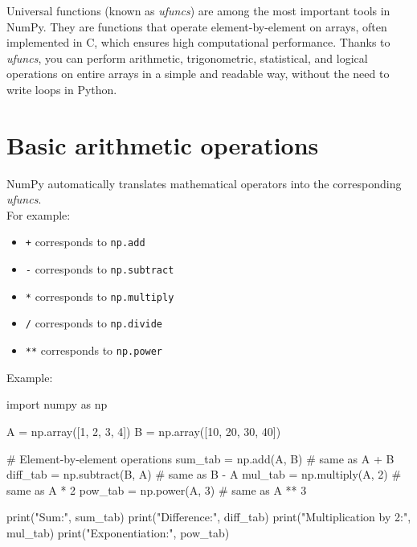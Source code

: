 \documentclass[
  english,
  letterpaper,
  DIV=11,
  numbers=noendperiod]{scrreprt}
\newenvironment{Shaded}{\begin{snugshade}}{\end{snugshade}}
\newcommand{\BuiltInTok}[1]{\textcolor[rgb]{0.00,0.23,0.31}{#1}}
\newcommand{\CommentTok}[1]{\textcolor[rgb]{0.37,0.37,0.37}{#1}}
\newcommand{\DecValTok}[1]{\textcolor[rgb]{0.68,0.00,0.00}{#1}}
\newcommand{\ImportTok}[1]{\textcolor[rgb]{0.00,0.46,0.62}{#1}}
\newcommand{\NormalTok}[1]{\textcolor[rgb]{0.00,0.23,0.31}{#1}}
\newcommand{\OperatorTok}[1]{\textcolor[rgb]{0.37,0.37,0.37}{#1}}
\newcommand{\StringTok}[1]{\textcolor[rgb]{0.13,0.47,0.30}{#1}}
\providecommand{\tightlist}{%
  \setlength{\itemsep}{0pt}\setlength{\parskip}{0pt}}
\begin{document}
Universal functions (known as \emph{ufuncs}) are among the most
important tools in NumPy. They are functions that operate
element-by-element on arrays, often implemented in C, which ensures high
computational performance. Thanks to \emph{ufuncs}, you can perform
arithmetic, trigonometric, statistical, and logical operations on entire
arrays in a simple and readable way, without the need to write loops in
Python.

\section{Basic arithmetic operations}\label{basic-arithmetic-operations}

NumPy automatically translates mathematical operators into the
corresponding \emph{ufuncs}.\\
For example:

\begin{itemize}
\tightlist
\item
  \texttt{+} corresponds to \texttt{np.add}
\item
  \texttt{-} corresponds to \texttt{np.subtract}
\item
  \texttt{*} corresponds to \texttt{np.multiply}
\item
  \texttt{/} corresponds to \texttt{np.divide}
\item
  \texttt{**} corresponds to \texttt{np.power}
\end{itemize}

Example:

\begin{Shaded}
\begin{Highlighting}[]
\ImportTok{import}\NormalTok{ numpy }\ImportTok{as}\NormalTok{ np}

\NormalTok{A }\OperatorTok{=}\NormalTok{ np.array([}\DecValTok{1}\NormalTok{, }\DecValTok{2}\NormalTok{, }\DecValTok{3}\NormalTok{, }\DecValTok{4}\NormalTok{])}
\NormalTok{B }\OperatorTok{=}\NormalTok{ np.array([}\DecValTok{10}\NormalTok{, }\DecValTok{20}\NormalTok{, }\DecValTok{30}\NormalTok{, }\DecValTok{40}\NormalTok{])}

\CommentTok{\# Element{-}by{-}element operations}
\NormalTok{sum\_tab }\OperatorTok{=}\NormalTok{ np.add(A, B)       }\CommentTok{\# same as A + B}
\NormalTok{diff\_tab }\OperatorTok{=}\NormalTok{ np.subtract(B, A) }\CommentTok{\# same as B {-} A}
\NormalTok{mul\_tab }\OperatorTok{=}\NormalTok{ np.multiply(A, }\DecValTok{2}\NormalTok{)  }\CommentTok{\# same as A * 2}
\NormalTok{pow\_tab }\OperatorTok{=}\NormalTok{ np.power(A, }\DecValTok{3}\NormalTok{)     }\CommentTok{\# same as A ** 3}

\BuiltInTok{print}\NormalTok{(}\StringTok{"Sum:"}\NormalTok{, sum\_tab)}
\BuiltInTok{print}\NormalTok{(}\StringTok{"Difference:"}\NormalTok{, diff\_tab)}
\BuiltInTok{print}\NormalTok{(}\StringTok{"Multiplication by 2:"}\NormalTok{, mul\_tab)}
\BuiltInTok{print}\NormalTok{(}\StringTok{"Exponentiation:"}\NormalTok{, pow\_tab)}
\end{Highlighting}
\end{Shaded}
\end{document}
